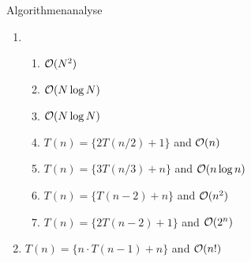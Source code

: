 \documentclass{article}
\begin{document}
\begin{exercise}{Algorithmenanalyse}
  \begin{solution}
    \begin{enumerate}
      \item \begin{enumerate}
              \item $\mathcal{O}(N^2)$
              \item $\mathcal{O}(N \log N)$
              \item $\mathcal{O}(N \log N)$
              \item $T(n)=\{2T(n/2) + 1\}$ and $\mathcal{O}(n)$
              \item $T(n)=\{3T(n/3) + n\}$ and $\mathcal{O}(n \log n)$
              \item $T(n)=\{T(n-2) + n\}$ and $\mathcal{O}(n^2)$
              \item $T(n)=\{2T(n-2) + 1\}$ and $\mathcal{O}(2^n)$
            \end{enumerate}
      \item $T(n)=\{n \cdot T(n-1) + n\}$ and $\mathcal{O}(n!)$
    \end{enumerate}
  \end{solution}
\end{exercise}
\end{document}
